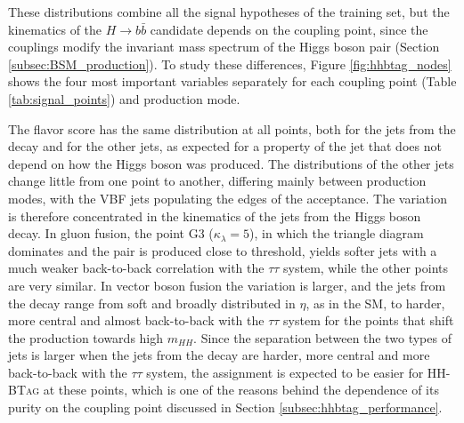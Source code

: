 These distributions combine all the signal hypotheses of the training set, but the kinematics of the $H\rightarrow b\bar{b}$ candidate depends on the coupling point, since the couplings modify the invariant mass spectrum of the Higgs boson pair (Section \ref{subsec:BSM_production}). To study these differences, Figure \ref{fig:hhbtag_nodes} shows the four most important variables separately for each coupling point (Table \ref{tab:signal_points}) and production mode. 

The flavor score has the same distribution at all points, both for the jets from the decay and for the other jets, as expected for a property of the jet that does not depend on how the Higgs boson was produced. The distributions of the other jets change little from one point to another, differing mainly between production modes, with the VBF jets populating the edges of the acceptance. The variation is therefore concentrated in the kinematics of the jets from the Higgs boson decay. In gluon fusion, the point G3 ($\kappa_\lambda = 5$), in which the triangle diagram dominates and the pair is produced close to threshold, yields softer jets with a much weaker back-to-back correlation with the $\tau\tau$ system, while the other points are very similar. In vector boson fusion the variation is larger, and the jets from the decay range from soft and broadly distributed in $\eta$, as in the SM, to harder, more central and almost back-to-back with the $\tau\tau$ system for the points that shift the production towards high $m_{HH}$. Since the separation between the two types of jets is larger when the jets from the decay are harder, more central and more back-to-back with the $\tau\tau$ system, the assignment is expected to be easier for \textsc{HH-BTag} at these points, which is one of the reasons behind the dependence of its purity on the coupling point discussed in Section \ref{subsec:hhbtag_performance}.\medskip
